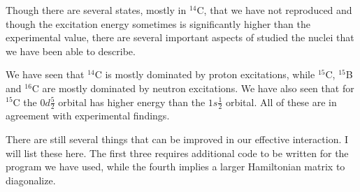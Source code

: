 
Though there are several states, mostly in $^{14}$C, that we have not
reproduced and though the excitation energy sometimes is significantly higher
than the experimental value, there are several  important
aspects of studied the nuclei that we have been able to describe.

We have seen that $^{14}$C is mostly dominated by proton excitations, while
$^{15}$C, $^{15}$B and $^{16}$C are mostly dominated by neutron excitations. We
have also seen that for $^{15}$C the $0d\frac52$ orbital has higher energy than
the $1s\frac12$ orbital. All of these are in agreement with experimental
findings.

There are still several things that can be improved in our effective
interaction. I will list these here. The first three requires additional code
to be written for the program we have used, while the fourth implies a larger
Hamiltonian matrix to diagonalize.

